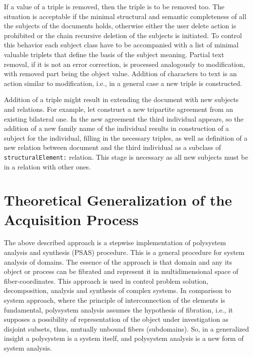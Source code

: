\documentclass[conference]{IEEEtran}
\begin{document}
If a value of a triple is removed, then the triple is to be removed
too.  The situation is acceptable if the minimal structural and
semantic completeness of all the subjects of the documents holds,
otherwise either the user delete action is prohibited or the chain
recursive deletion of the subjects is initiated.  To control this
behavior each subject class have to be accompanied with a list of
minimal valuable triplets that define the basis of the subject
meaning.  Partial text removal, if it is not an error correction, is
processed analogously to modification, with removed part being the
object value.  Addition of characters to text is an action similar to
modification, i.e., in a general case a new triple is constructed.

Addition of a triple might result in extending the document with new
subjects and relations.  For example, let construct a new tripartite
agreement from an existing bilateral one.  In the new agreement the
third individual appears, so the addition of a new family name of the
individual results in construction of a subject for the individual,
filling in the necessary triples, as well as definition of a new
relation between document and the third individual as a subclass of
\texttt{structuralElement:} relation.  This stage is necessary as all
new subjects must be in a relation with other ones.

\section{Theoretical Generalization of the Acquisition Process}

The above described approach is a stepwise implementation of polysystem analysis and synthesis \cite{father} (PSAS) procedure. This is a general procedure for system analysis of domains. The essence of the approach is that domain and any its object or process can be fibrated and represent it in multidimensional space of fiber-coordinates. This approach is used in control problem solution, decomposition, analysis and synthesis of complex systems. In comparison to system approach, where the principle of interconnection of the elements is fundamental, polysystem analysis assumes the hypothesis of fibration, i.e., it supposes a possibility of representation of the object under investigation as disjoint subsets, thus, mutually unbound fibers (subdomains). So, in a generalized insight a polysystem is a system itself, and polysystem analysis is a new form of system analysis.
\end{document}

